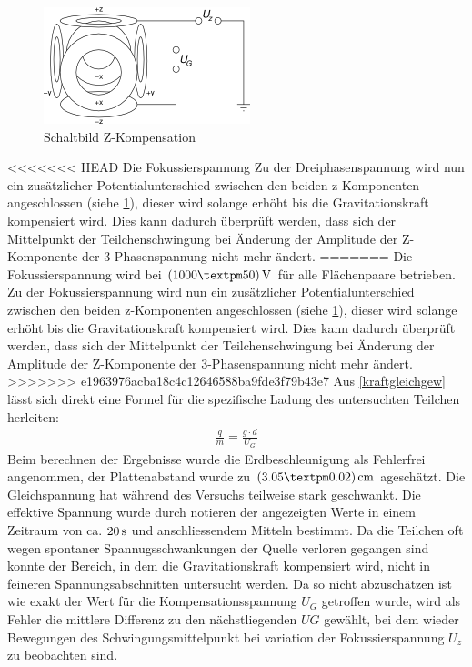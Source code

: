 \documentclass[a4paper,12pt]{article}
\begin{document}
\begin{figure}[htb]
		\centering
		\includegraphics{Schaltbild_Z_Kompensation.png}
		\caption{Schaltbild Z-Kompensation}
		\label{schalt-z}
\end{figure}
<<<<<<< HEAD
Die Fokussierspannung
Zu der Dreiphasenspannung wird nun ein zusätzlicher Potentialunterschied zwischen den beiden z-Komponenten angeschlossen (siehe \ref{schalt-z}), dieser wird solange erhöht bis die Gravitationskraft
kompensiert wird. Dies kann dadurch überprüft werden, dass sich der Mittelpunkt der Teilchenschwingung bei Änderung der Amplitude der Z-Komponente der 3-Phasenspannung nicht mehr ändert.
=======
Die Fokussierspannung wird bei $\unit[(1000±50)]{V}$ für alle Flächenpaare betrieben.
Zu der Fokussierspannung wird nun ein zusätzlicher Potentialunterschied zwischen den beiden z-Komponenten angeschlossen
(siehe \ref{schalt-z}), dieser wird solange erhöht bis die Gravitationskraft
kompensiert wird. Dies kann dadurch überprüft werden, dass sich der Mittelpunkt der Teilchenschwingung bei Änderung
der Amplitude der Z-Komponente der 3-Phasenspannung nicht mehr ändert.
>>>>>>> e1963976acba18c4c12646588ba9fde3f79b43e7
Aus \ref{kraftgleichgew} lässt sich direkt eine Formel für die spezifische Ladung des untersuchten Teilchen herleiten:
\begin{align*}\label{zspezm}
	\frac{q}{m} = \frac{g\cdot d}{U_{G}}
\end{align*}
Beim berechnen der Ergebnisse wurde die Erdbeschleunigung als Fehlerfrei angenommen, der Plattenabstand wurde zu $\unit[(3.05±0.02)]{cm}$ ageschätzt.
Die Gleichspannung hat während des Versuchs teilweise
stark geschwankt. Die effektive Spannung wurde durch notieren der angezeigten Werte in einem Zeitraum
von ca. $\unit[20]{s}$ und anschliessendem Mitteln bestimmt. Da die Teilchen oft wegen spontaner Spannugsschwankungen
der Quelle verloren gegangen sind konnte der Bereich, in dem die Gravitationskraft kompensiert wird, nicht in feineren Spannungsabschnitten untersucht werden.
Da so nicht abzuschätzen ist wie exakt der Wert für die Kompensationsspannung $U_G$ getroffen wurde, wird als Fehler die mittlere Differenz zu den nächstliegenden 
$UG$ gewählt, bei dem wieder Bewegungen des Schwingungsmittelpunkt bei variation  der Fokussierspannung $U_z$ zu beobachten sind.
\end{document}
